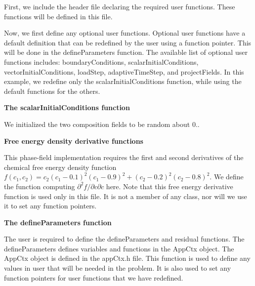 First, we include the header file declaring the required user functions. These functions will be defined in this file.


\begin{DoxyCodeInclude}

\end{DoxyCodeInclude}


Now, we first define any optional user functions. Optional user functions have a default definition that can be redefined by the user using a function pointer. This will be done in the {\ttfamily define\-Parameters} function. The available list of optional user functions includes\-: {\ttfamily boundary\-Conditions}, {\ttfamily scalar\-Initial\-Conditions}, {\ttfamily vector\-Initial\-Conditions}, {\ttfamily load\-Step}, {\ttfamily adaptive\-Time\-Step}, and {\ttfamily project\-Fields}. In this example, we redefine only the {\ttfamily scalar\-Initial\-Conditions} function, while using the default functions for the others.

{\bfseries  The {\ttfamily scalar\-Initial\-Conditions} function }

We initialized the two composition fields to be random about 0..


\begin{DoxyCodeInclude}

\end{DoxyCodeInclude}


{\bfseries  Free energy density derivative functions }

This phase-\/field implementation requires the first and second derivatives of the chemical free energy density function $f(c_1,c_2) = c_2(c_1-0.1)^2(c_1-0.9)^2 + (c_2-0.2)^2(c_2-0.8)^2$. We define the function computing $\partial^2 f/\partial c \partial c$ here. Note that this free energy derivative function is used only in this file. It is not a member of any class, nor will we use it to set any function pointers.


\begin{DoxyCodeInclude}

\end{DoxyCodeInclude}


{\bfseries  The {\ttfamily define\-Parameters} function }

The user is required to define the {\ttfamily define\-Parameters} and {\ttfamily residual} functions. The {\ttfamily define\-Parameters} defines variables and functions in the {\ttfamily App\-Ctx} object. The {\ttfamily App\-Ctx} object is defined in the app\-Ctx.\-h file. This function is used to define any values in {\ttfamily user} that will be needed in the problem. It is also used to set any function pointers for user functions that we have redefined.

